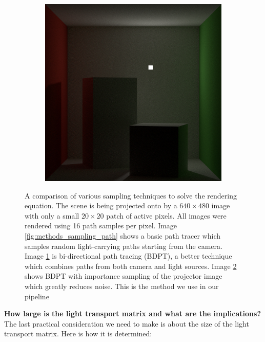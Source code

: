 \begin{figure}[]
\begin{subfigure}[b]{0.32\textwidth}
        \caption{}
        \label{fig:methods_sampling_bdpt}
    \end{subfigure}
    \hfill
    \begin{subfigure}[b]{0.32\textwidth}
        \centering
        \includegraphics[width=\textwidth]{images/03-sampling_bdpt_importance.jpg}
        \caption{}
        \label{fig:methods_sampling_bdpt_importance}
    \end{subfigure}
    \caption{A comparison of various sampling techniques to solve the rendering equation. The scene is being projected onto by a \(640 \times 480\) image with only a small \(20 \times 20\) patch of active pixels. All images were rendered using 16 path samples per pixel. Image \ref{fig:methods_sampling_path} shows a basic path tracer which samples random light-carrying paths starting from the camera. Image \ref{fig:methods_sampling_bdpt} is bi-directional path tracing (BDPT), a better technique which combines paths from both camera and light sources. Image \ref{fig:methods_sampling_bdpt_importance} shows BDPT with importance sampling of the projector image which greatly reduces noise. This is the method we use in our pipeline}
    \label{fig:methods_sampling}
\end{figure}

\textbf{How large is the light transport matrix and what are the implications?} The last practical consideration we need to make is about the size of the light transport matrix. Here is how it is determined:

